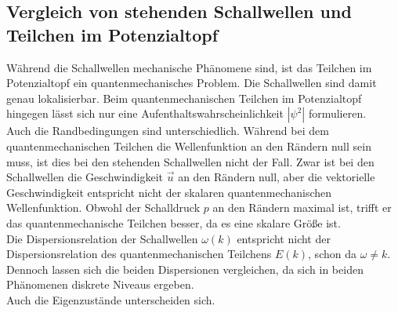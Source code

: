 \subsection{Vergleich von stehenden Schallwellen und Teilchen im Potenzialtopf}
Während die Schallwellen mechanische Phänomene sind, ist das Teilchen im Potenzialtopf ein quantenmechanisches Problem.
Die Schallwellen sind damit genau lokalisierbar.
Beim quantenmechanischen Teilchen im Potenzialtopf hingegen lässt sich nur eine Aufenthaltswahrscheinlichkeit $|\psi^2|$ formulieren.\\
Auch die Randbedingungen sind unterschiedlich.
Während bei dem quantenmechanischen Teilchen die Wellenfunktion an den Rändern null sein muss, ist dies bei den stehenden Schallwellen nicht der Fall.
Zwar ist bei den Schallwellen die Geschwindigkeit $\vec{u}$ an den Rändern null, aber die vektorielle Geschwindigkeit entspricht nicht der skalaren quantenmechanischen Wellenfunktion.
Obwohl der Schalldruck $p$ an den Rändern maximal ist, trifft er das quantenmechanische Teilchen besser, da es eine skalare Größe ist.\\
Die Dispersionsrelation der Schallwellen $\omega(k)$ entspricht nicht der Dispersionsrelation des quantenmechanischen Teilchens $E(k)$, schon da $\omega ≠ k$.
Dennoch lassen sich die beiden Dispersionen vergleichen, da sich in beiden Phänomenen diskrete Niveaus ergeben.\\
Auch die Eigenzustände unterscheiden sich.
%
%
%
